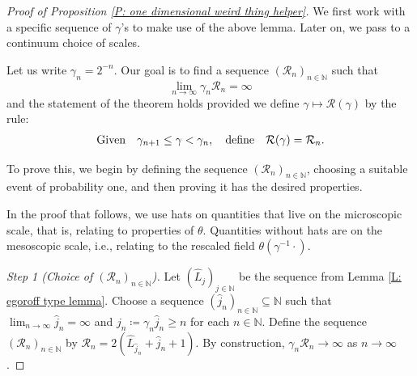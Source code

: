 \documentclass[12pt]{amsart}
\newcommand{\F}{\mathscr{F}}
\begin{document}
	
	\begin{proof}[Proof of Proposition \ref{P: one dimensional weird thing helper}] We first work with a specific sequence of $ \gamma $'s to make use of the above lemma. Later on, we pass to a continuum choice of scales.
	
	Let us write $ \gamma_{n} = 2^{-n} $. Our goal is to find a sequence $(\mathcal{R}_{n})_{n \in \mathbb{N}}$ such that 
		\begin{equation*}
			\lim_{n \to \infty} \gamma_{n} \mathcal{R}_{n} = \infty
		\end{equation*} 
	and the statement of the theorem holds provided we define $\gamma \mapsto \mathcal{R}(\gamma)$ by the rule:
		\begin{align} \label{E: definition of tau appendix}
	{ \rm Given }
	\quad \gamma_{ n + 1 } \leq \gamma < \gamma_{n} ,
	\quad { \rm define } \quad
	\mathcal{R} ( \gamma ) = \mathcal{R}_{ n }.
\end{align}
		

To prove this, we begin by defining the sequence $(\mathcal{R}_{n})_{n \in \mathbb{N}}$, choosing a suitable event of probability one, and then proving it has the desired properties.  

In the proof that follows, we use hats on quantities that live on the microscopic scale, that is, relating to properties of $\theta$.  Quantities without hats are on the mesoscopic scale, i.e., relating to the rescaled field $\theta(\gamma^{-1} \cdot)$.

\textit{Step 1 (Choice of $(\mathcal{R}_{n})_{n \in \mathbb{N}}$).} Let $( \widehat{L}_{j})_{j \in \mathbb{N}}$ be the sequence from Lemma \ref{L: egoroff type lemma}. Choose a sequence $( \widehat{j}_{n})_{n \in \mathbb{N}} \subseteq \mathbb{N}$ such that $\lim_{n \to \infty} \widehat{j}_{n} = \infty$ and $ j_n \coloneqq \gamma_{n} \widehat{j}_{n} \geq n$ for each $n \in \mathbb{N}$. Define the sequence $(\mathcal{R}_{n})_{n \in \mathbb{N}}$ by $ \mathcal{R}_{n} = 2 ( \widehat{L}_{ \widehat{j}_{n}} + \widehat{j}_{n} + 1 )$. By construction, $\gamma_{n} \mathcal{R}_{n} \to \infty$ as $n \to \infty$.


\end{proof}
\end{document}

